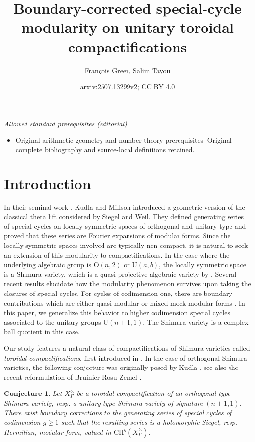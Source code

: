 \documentclass[11pt,letterpaper,english]{amsart}
\title{Boundary-corrected special-cycle modularity on unitary toroidal compactifications}
\author{François Greer, Salim Tayou}
\date{arxiv:2507.13299v2; CC BY 4.0}
\numberwithin{equation}{subsection}
\numberwithin{equation}{section}
\theoremstyle{plain}
\newtheorem{conjecture}[theorem]{Conjecture}
\theoremstyle{remark}
\begin{document}
\maketitle
\noindent\textit{Allowed standard prerequisites (editorial).}\begin{itemize}
\item Original arithmetic geometry and number theory prerequisites. Original complete bibliography and source-local definitions retained.
\end{itemize}\medskip
\section{Introduction}


In their seminal work \cite{kudla-millson}, Kudla and Millson introduced a geometric version of the classical theta lift considered by Siegel and Weil. They defined generating series of special cycles on locally symmetric spaces of orthogonal and unitary type and proved that these series are Fourier expansions of modular forms. Since the locally symmetric spaces involved are typically non-compact, it is natural to seek an extension of this modularity to compactifications. In the case where the underlying algebraic group is $\mathrm O(n,2)$ or $\mathrm U(a,b)$, the locally symmetric space is a Shimura variety, which is a quasi-projective algebraic variety by \cite{bailyborel}. Several recent results elucidate how the modularity phenomenon survives upon taking the closures of special cycles. For cycles of codimension one, there are boundary contributions which are either quasi-modular or mixed mock modular forms \cite{engel-greer-tayou}. In this paper, we generalize this behavior to higher codimension special cycles associated to the unitary groups $\mathrm U(n+1,1)$. The Shimura variety is a complex ball quotient in this case.


Our study features a natural class of compactifications of Shimura varieties called \emph{toroidal compactifications}, first introduced in \cite{amrt}. In the case of orthogonal Shimura varieties, the following conjecture was originally posed by Kudla \cite[Problem 3]{kudla_special_2004}, see also the recent reformulation of Bruinier-Rosu-Zemel \cite{bruinier-rosu-zemel}. 

\begin{conjecture}\label{main-conjecture}
Let $X_\Gamma^\Sigma$ be a toroidal compactification of an orthogonal type Shimura variety, resp. a unitary type Shimura variety of signature $(n+1,1)$. There exist boundary corrections to the generating series of special cycles of codimension $g\geq 1$ such that the resulting series is a holomorphic Siegel, resp. Hermitian,  modular form, valued in $\mathrm{CH}^g(X_\Gamma^\Sigma)$.
\end{conjecture}
\end{document}

